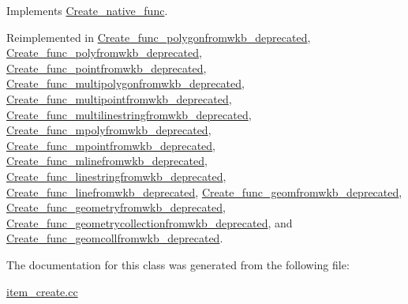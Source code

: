 Implements \mbox{\hyperlink{classCreate__native__func_a52a42d6a191ca6e9627fb34d91e97ebc}{Create\+\_\+native\+\_\+func}}.



Reimplemented in \mbox{\hyperlink{classCreate__func__polygonfromwkb__deprecated_a5eec1c4da2bfbb22a7804ea5a000badd}{Create\+\_\+func\+\_\+polygonfromwkb\+\_\+deprecated}}, \mbox{\hyperlink{classCreate__func__polyfromwkb__deprecated_a918890964239746813b0bf0786c89370}{Create\+\_\+func\+\_\+polyfromwkb\+\_\+deprecated}}, \mbox{\hyperlink{classCreate__func__pointfromwkb__deprecated_a3d3d96288a0fd07206e11c3b3f5277bc}{Create\+\_\+func\+\_\+pointfromwkb\+\_\+deprecated}}, \mbox{\hyperlink{classCreate__func__multipolygonfromwkb__deprecated_a81e85bfb32c7c2bbad16e0d0c3fe9b95}{Create\+\_\+func\+\_\+multipolygonfromwkb\+\_\+deprecated}}, \mbox{\hyperlink{classCreate__func__multipointfromwkb__deprecated_a5f109e5e5ae27fa6c53ceb0976197204}{Create\+\_\+func\+\_\+multipointfromwkb\+\_\+deprecated}}, \mbox{\hyperlink{classCreate__func__multilinestringfromwkb__deprecated_a88004232b80c2ff45f41748a7d293bb6}{Create\+\_\+func\+\_\+multilinestringfromwkb\+\_\+deprecated}}, \mbox{\hyperlink{classCreate__func__mpolyfromwkb__deprecated_a54509d67c49eaac43edf999c131c4dc1}{Create\+\_\+func\+\_\+mpolyfromwkb\+\_\+deprecated}}, \mbox{\hyperlink{classCreate__func__mpointfromwkb__deprecated_ad724e9ffb73a5aaa630acc577bf341b7}{Create\+\_\+func\+\_\+mpointfromwkb\+\_\+deprecated}}, \mbox{\hyperlink{classCreate__func__mlinefromwkb__deprecated_afc7d5e74ffec6ebd48da9ae7e781cd51}{Create\+\_\+func\+\_\+mlinefromwkb\+\_\+deprecated}}, \mbox{\hyperlink{classCreate__func__linestringfromwkb__deprecated_a56b6284f5656055950fd717336310323}{Create\+\_\+func\+\_\+linestringfromwkb\+\_\+deprecated}}, \mbox{\hyperlink{classCreate__func__linefromwkb__deprecated_a970684ef7c4db5f25bbd81be427b525d}{Create\+\_\+func\+\_\+linefromwkb\+\_\+deprecated}}, \mbox{\hyperlink{classCreate__func__geomfromwkb__deprecated_a3de8d67c5e21d24004f3168fc26c32a4}{Create\+\_\+func\+\_\+geomfromwkb\+\_\+deprecated}}, \mbox{\hyperlink{classCreate__func__geometryfromwkb__deprecated_ad703efb8f0aeacc91ff8d08301a55dd7}{Create\+\_\+func\+\_\+geometryfromwkb\+\_\+deprecated}}, \mbox{\hyperlink{classCreate__func__geometrycollectionfromwkb__deprecated_a143fde30a0fff5b0f79456a9ea9c5ae0}{Create\+\_\+func\+\_\+geometrycollectionfromwkb\+\_\+deprecated}}, and \mbox{\hyperlink{classCreate__func__geomcollfromwkb__deprecated_a37dd2357ed2c8bb8f97450aaaa47c158}{Create\+\_\+func\+\_\+geomcollfromwkb\+\_\+deprecated}}.



The documentation for this class was generated from the following file\+:\begin{DoxyCompactItemize}
\item 
\mbox{\hyperlink{item__create_8cc}{item\+\_\+create.\+cc}}\end{DoxyCompactItemize}
